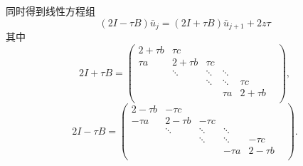 \documentclass{article}
\begin{document}
同时得到线性方程组$$(2I - \tau B)\bar{u}_{j} = (2I + \tau B)\bar{u}_{j+1} + 2z\tau$$
其中
$$
2I + \tau B = \begin{pmatrix}
                2 +\tau b  &   \tau c     &            &            &            & \\
                \tau a     &   2 +\tau b  &   \tau c   &            &            & \\
                           &   \ddots     &   \ddots   &   \ddots   &            & \\
                           &              &   \ddots   &   \ddots   &  \tau c    & \\
                           &              &            &   \tau a   &  2 +\tau b & \\
            \end{pmatrix},
$$
$$
2I - \tau B = \begin{pmatrix}
                2 -\tau b  &   -\tau c    &            &            &            & \\
                -\tau a    &   2 -\tau b  &   -\tau c  &            &            & \\
                           &   \ddots     &   \ddots   &   \ddots   &            & \\
                           &              &   \ddots   &   \ddots   &  -\tau c   & \\
                           &              &            &   -\tau a  &  2 -\tau b & \\
            \end{pmatrix}.
$$
\end{document}
